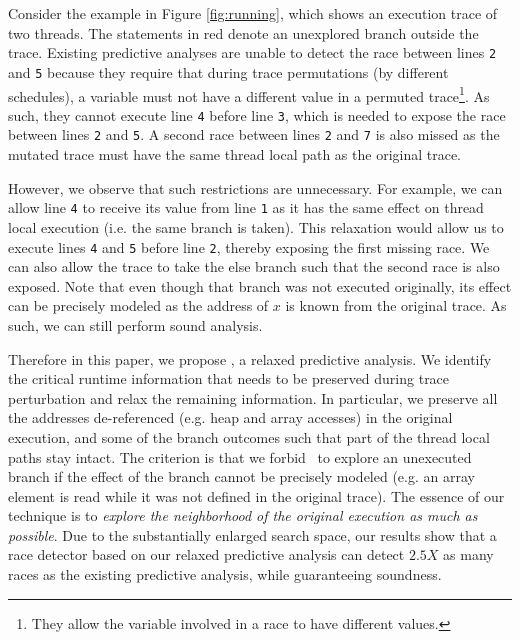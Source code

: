 Consider the example in Figure \ref{fig:running}, which shows an execution trace of two threads. The statements in red 
denote an unexplored branch outside the trace. Existing predictive analyses are unable to detect the race between 
lines {\tt 2} and {\tt 5} because they require that during trace permutations (by different schedules), a variable must not have
a different value in a permuted trace\footnote{They allow the variable involved in a race to have different values.}.
As such, they cannot execute line {\tt 4} before line {\tt 3}, which is needed to expose the race between lines {\tt 2}
and {\tt 5}. 
A second race between lines {\tt 2} and {\tt 7} is also missed as the mutated trace must have the same thread local
path as the original trace. 

However, we observe that such restrictions are unnecessary. For example, we can allow line {\tt 4} to receive its
value from line {\tt 1} as it has the same effect on thread local execution (i.e. the same branch is taken). 
This relaxation would allow us to execute lines {\tt 4} and {\tt 5} before line {\tt 2}, thereby exposing 
the first missing race. We can also allow the trace to take the else branch such that the second race is also exposed. 
Note that even though that branch was not executed originally, its effect can be precisely modeled as the address 
of $x$ is known from the original trace. As such, we can still perform sound analysis.

Therefore in this paper, we propose \sysname, a relaxed predictive analysis. We identify the critical runtime
information that needs to be preserved during trace perturbation and relax the remaining information. 
In particular, we preserve all the addresses de-referenced (e.g. heap and array accesses) in the original execution,
and some of the branch outcomes such that part of the thread local paths stay intact. The criterion is that
we forbid \sysname\ to explore an unexecuted branch if the effect of the branch cannot be precisely modeled
(e.g. an array element is read while it was not defined in the original trace). The essence of our technique 
is to {\em explore the neighborhood of the original execution as much as possible}. Due to the substantially
enlarged search space, our results show that a race detector based on our relaxed predictive analysis 
can detect $2.5X$ as many races as the existing predictive analysis, while guaranteeing soundness. 

